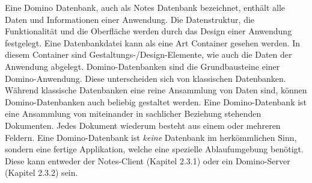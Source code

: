 Eine Domino Datenbank, auch als Notes Datenbank bezeichnet, enthält alle Daten und \linebreak Informationen einer Anwendung. 
Die Datenstruktur, die Funktionalität und die Oberfläche \linebreak werden durch das Design einer Anwendung festgelegt. Eine Datenbankdatei
kann als eine Art Container gesehen werden. In diesem Container sind Gestaltungs-/Design-Elemente, wie auch die Daten der Anwendung abgelegt.
Domino-Datenbanken sind die Grundbausteine einer Domino-Anwendung. Diese unterscheiden sich von klassischen Datenbanken.
Während \linebreak klassische Datenbanken eine reine Ansammlung von Daten sind, können Domino-Datenbanken auch beliebig gestaltet werden. 
Eine Domino-Datenbank ist eine Ansammlung von miteinander in sachlicher Beziehung stehenden Dokumenten. Jedes Dokument wiederum besteht  
aus einem oder mehreren Feldern\cite{knaepper}. \newline
%
Eine Domino-Datenbank ist \textit{keine} Datenbank im herk\"ommlichen Sinn, sondern eine fertige \linebreak Applikation, welche eine spezielle
Ablaufumgebung ben\"otigt. Diese kann entweder der Notes-Client (Kapitel 2.3.1) oder ein Domino-Server (Kapitel 2.3.2) sein\cite{knaepper}.
\vspace{0.5cm}

